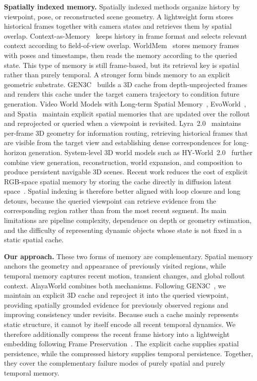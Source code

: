 \textbf{Spatially indexed memory.}
Spatially indexed methods organize history by viewpoint, pose, or reconstructed scene geometry.
A lightweight form stores historical frames together with camera states and retrieves them by spatial overlap.
Context-as-Memory~\cite{yu2025contextasmemory} keeps history in frame format and selects relevant context according to field-of-view overlap.
WorldMem~\cite{xiao2025worldmem} stores memory frames with poses and timestamps, then reads the memory according to the queried state.
This type of memory is still frame-based, but its retrieval key is spatial rather than purely temporal.
A stronger form binds memory to an explicit geometric substrate.
GEN3C~\cite{ren2025gen3c} builds a 3D cache from depth-unprojected frames and renders this cache under the target camera trajectory to condition future generation.
Video World Models with Long-term Spatial Memory~\cite{wu2025longtermspatialmemory}, EvoWorld~\cite{wang2025evoworld}, and Spatia~\cite{zhao2025spatia} maintain explicit spatial memories that are updated over the rollout and reprojected or queried when a viewpoint is revisited.
Lyra~2.0~\cite{shen2026lyra2} maintains per-frame 3D geometry for information routing, retrieving historical frames that are visible from the target view and establishing dense correspondences for long-horizon generation.
System-level 3D world models such as HY-World~2.0~\cite{hyworld22026} further combine view generation, reconstruction, world expansion, and composition to produce persistent navigable 3D scenes.
Recent work reduces the cost of explicit RGB-space spatial memory by storing the cache directly in diffusion latent space~\cite{zhao2025spatia}.
Spatial indexing is therefore better aligned with loop closure and long detours, because the queried viewpoint can retrieve evidence from the corresponding region rather than from the most recent segment.
Its main limitations are pipeline complexity, dependence on depth or geometry estimation, and the difficulty of representing dynamic objects whose state is not fixed in a static spatial cache.

\textbf{Our approach.}
These two forms of memory are complementary.
Spatial memory anchors the geometry and appearance of previously visited regions, while temporal memory captures recent motion, transient changes, and global rollout context.
AlayaWorld combines both mechanisms.
Following GEN3C~\cite{ren2025gen3c}, we maintain an explicit 3D cache and reproject it into the queried viewpoint, providing spatially grounded evidence for previously observed regions and improving consistency under revisits.
Because such a cache mainly represents static structure, it cannot by itself encode all recent temporal dynamics.
We therefore additionally compress the recent frame history into a lightweight embedding following Frame Preservation~\cite{zhang2025framepreservation}.
The explicit cache supplies spatial persistence, while the compressed history supplies temporal persistence.
Together, they cover the complementary failure modes of purely spatial and purely temporal memory.

